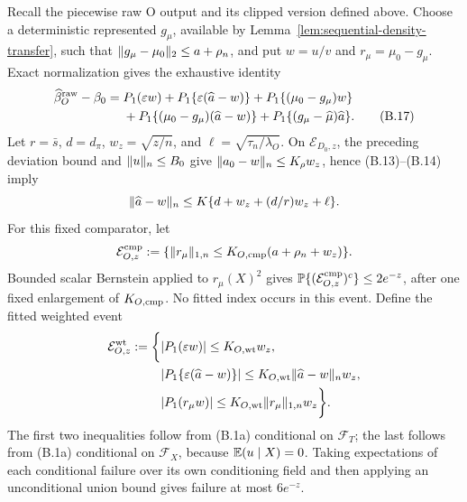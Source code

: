 Recall the piecewise raw O output and its clipped version defined above.
Choose a deterministic represented \(g_\mu\), available by
Lemma~\ref{lem:sequential-density-transfer}, such that
\(\lVert g_\mu-\mu_0\rVert_2\le a+\rho_n\), and put \(w=u/v\) and
\(r_\mu=\mu_0-g_\mu\).
Exact normalization gives the exhaustive identity
\begin{align}
 \widehat\beta_O^{\rm raw}-\beta_0
={}&P_1(\varepsilon w)+P_1\{\varepsilon(\widehat a-w)\}
 +P_1\{(\mu_0-g_\mu)w\}\nonumber\\
 &+P_1\{(\mu_0-g_\mu)(\widehat a-w)\}
 +P_1\{(g_\mu-\widehat\mu)\widehat a\}.
 \tag{B.17}
\end{align}
Let \(r=\bar s\), \(d=d_\pi\), \(w_z=\sqrt{z/n}\), and
\(\ell=\sqrt{\tau_n/\lambda_O}\).  On \(\mathcal E_{D_0,z}\), the
preceding deviation bound and \(\lVert u\rVert_n\le B_0\) give
\(\lVert a_0-w\rVert_n\le K_\rho w_z\), hence (B.13)--(B.14) imply
\[
 \lVert \widehat a-w\rVert_n\le K\{d+w_z+(d/r)w_z+\ell\}.
\]
For this fixed comparator, let
\[
 \mathcal E_{O,z}^{\rm cmp}
 :=\{\lVert r_\mu\rVert_{1,n}\le K_{O,\rm cmp}(a+\rho_n+w_z)\}.
\]
Bounded scalar Bernstein applied to \(r_\mu(X)^2\) gives
\(\mathbb P\{(\mathcal E_{O,z}^{\rm cmp})^c\}\le2e^{-z}\), after one fixed
enlargement of \(K_{O,\rm cmp}\).  No fitted index occurs in this event.
Define the fitted weighted event
\[
\begin{split}
 \mathcal E_{O,z}^{\rm wt}:=\bigg\{&
 \lvert P_1(\varepsilon w)\rvert\le K_{O,\rm wt}w_z,\\
 &\lvert P_1\{\varepsilon(\widehat a-w)\}\rvert
 \le K_{O,\rm wt}\lVert \widehat a-w\rVert_n w_z,\\
 &\lvert P_1(r_\mu w)\rvert
 \le K_{O,\rm wt}\lVert r_\mu\rVert_{1,n} w_z\bigg\}.
\end{split}
\]
The first two inequalities follow from (B.1a) conditional on
\(\mathcal F_T\); the last follows from (B.1a) conditional on
\(\mathcal F_X\), because \(\mathbb E(u\mid X)=0\).  Taking expectations of
each conditional failure over its own conditioning field and then applying
an unconditional union bound gives failure at most \(6e^{-z}\).

